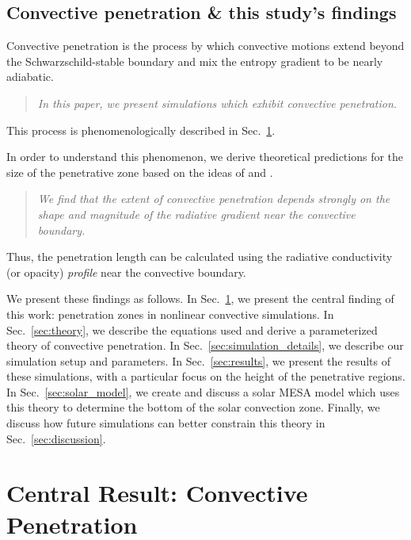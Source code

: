 \documentclass[twocolumn]{aastex631}
\begin{document}
\subsection{Convective penetration \& this study's findings}

Convective penetration is the process by which convective motions extend beyond the Schwarzschild-stable boundary and mix the entropy gradient to be nearly adiabatic.
\begin{quote}
\emph{
In this paper, we present simulations which exhibit convective penetration.
}
\end{quote}
This process is phenomenologically described in Sec.~\ref{sec:central_results}.

In order to understand this phenomenon, we derive theoretical predictions for the size of the penetrative zone based on the ideas of \citet{roxburgh1989} and \citet{zahn1991}.
\begin{quote}
\emph{
We find that the extent of convective penetration depends strongly on the shape and magnitude of the radiative gradient near the convective boundary.
}
\end{quote}
Thus, the penetration length can be calculated using the radiative conductivity (or opacity) \emph{profile} near the convective boundary.

We present these findings as follows.
In Sec.~\ref{sec:central_results}, we present the central finding of this work: penetration zones in nonlinear convective simulations.
In Sec.~\ref{sec:theory}, we describe the equations used and derive a parameterized theory of convective penetration.
In Sec.~\ref{sec:simulation_details}, we describe our simulation setup and parameters.
In Sec.~\ref{sec:results}, we present the results of these simulations, with a particular focus on the height of the penetrative regions.
In Sec.~\ref{sec:solar_model}, we create and discuss a solar MESA model which uses this theory to determine the bottom of the solar convection zone.
Finally, we discuss how future simulations can better constrain this theory in Sec.~\ref{sec:discussion}.

\section{Central Result: Convective Penetration}
\label{sec:central_results}
\end{document}
